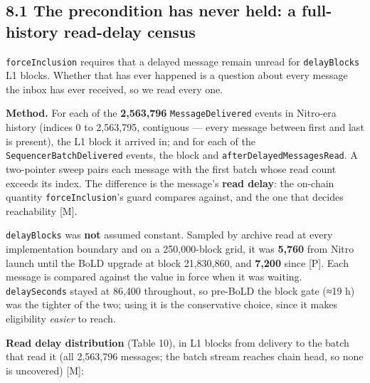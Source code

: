 \documentclass[conference]{IEEEtran}
\renewcommand{\_}{\textunderscore\allowbreak}
\begin{document}
\subsection{8.1 The precondition has never held: a full-history
read-delay
census}\label{the-precondition-has-never-held-a-full-history-read-delay-census}

\texttt{forceInclusion} requires that a delayed message remain unread
for \texttt{delayBlocks} L1 blocks. Whether that has ever happened is a
question about every message the inbox has ever received, so we read
every one.

\textbf{Method.} For each of the \textbf{2,563,796}
\texttt{MessageDelivered} events in Nitro-era history (indices 0 to
2,563,795, contiguous --- every message between first and last is
present), the L1 block it arrived in; and for each of the
\texttt{SequencerBatchDelivered} events, the block and
\texttt{afterDelayedMessagesRead}. A two-pointer sweep pairs each
message with the first batch whose read count exceeds its index. The
difference is the message's \textbf{read delay}: the on-chain quantity
\texttt{forceInclusion}'s guard compares against, and the one that
decides reachability {[}M{]}.

\texttt{delayBlocks} was \textbf{not} assumed constant. Sampled by
archive read at every implementation boundary and on a 250,000-block
grid, it was \textbf{5,760} from Nitro launch until the BoLD upgrade at
block 21,830,860, and \textbf{7,200} since {[}P{]}. Each message is
compared against the value in force when it was waiting.
\texttt{delaySeconds} stayed at 86,400 throughout, so pre-BoLD the block
gate (≈19 h) was the tighter of the two; using it is the conservative
choice, since it makes eligibility \emph{easier} to reach.

\textbf{Read delay distribution} (Table 10), in L1 blocks from delivery
to the batch that read it (all 2,563,796 messages; the batch stream
reaches chain head, so none is uncovered) {[}M{]}:
\end{document}
